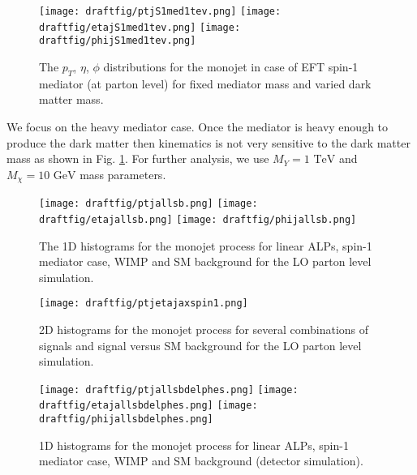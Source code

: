 \documentclass[aps,onecolumn,showpacs,superscriptaddress,groupedaddress,nofootinbib,preprint]{revtex4-1}
\begin{document}
\begin{figure} [H]
\begin{center}
\texttt{[image: draftfig/ptjS1med1tev.png]}
\texttt{[image: draftfig/etajS1med1tev.png]}
\texttt{[image: draftfig/phijS1med1tev.png]}
\caption{The $p_T$, $\eta$, $\phi$ distributions for the monojet  in case of EFT spin-1 mediator (at parton level) for fixed mediator mass and 
varied dark matter mass\label{spin1med}.}
\end{center}
\end{figure}

We focus on the heavy mediator case. Once the mediator is heavy enough to produce the 
dark matter then kinematics is not very sensitive to the dark matter mass as shown in Fig. \ref{spin1med}. For further analysis, we use 
 $M_Y=1\,\, \mbox{TeV}$ and  $M_{\chi}=10\,\, \mbox{GeV}$ mass parameters.



\begin{figure} [H]
\centering
\texttt{[image: draftfig/ptjallsb.png]}
\texttt{[image: draftfig/etajallsb.png]}
\texttt{[image: draftfig/phijallsb.png]}
\caption{The 1D histograms for the monojet process for linear ALPs, spin-1 mediator case, WIMP and SM background for the LO parton level simulation.\label{1Dand2DfeaturesPL1}}
\end{figure}


\begin{figure}%
\centering
\texttt{[image: draftfig/ptjetajaxspin1.png]}
\caption{2D histograms for the monojet process for several combinations of signals and signal  versus SM background for the LO parton level simulation.\label{1Dand2DfeaturesPL2}}
\end{figure}




\begin{figure} [H]
\centering
\texttt{[image: draftfig/ptjallsbdelphes.png]}
\texttt{[image: draftfig/etajallsbdelphes.png]}
\texttt{[image: draftfig/phijallsbdelphes.png]}
\caption{1D histograms for the monojet process for linear ALPs, spin-1 mediator case, WIMP and SM background (detector simulation).\label{1Dand2DfeaturesDL}}
\end{figure}
\end{document}
